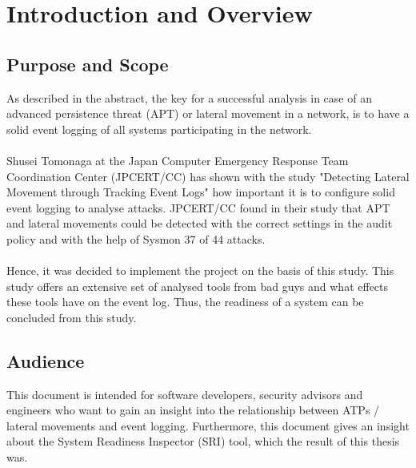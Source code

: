 \section{Introduction and Overview}
\subsection{Purpose and Scope}
As described in the abstract, the key for a successful analysis in case of an advanced persistence threat (APT) or lateral movement in a network, is to have a solid event logging of all systems participating in the network.
\\\\
Shusei Tomonaga at the Japan Computer Emergency Response Team Coordination Center (JPCERT/CC) has shown with the study "Detecting Lateral Movement through Tracking Event Logs" \cite{JPCERTDetectingLateralMovement} how important it is to configure solid event logging to analyse attacks. JPCERT/CC found in their study that APT and lateral movements could be detected with the correct settings in the audit policy and with the help of Sysmon 37 of 44 attacks.
\\\\
Hence, it was decided to implement the project on the basis of this study. This study offers an extensive set of analysed tools from bad guys and what effects these tools have on the event log. Thus, the readiness of a system can be concluded from this study.

\subsection{Audience}
This document is intended for software developers, security advisors and engineers who want to gain an insight into the relationship between ATPs / lateral movements and event logging. Furthermore, this document gives an insight about the System Readiness Inspector (SRI) tool, which the result of this thesis was.

